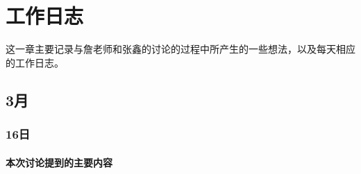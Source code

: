 
\chapter{工作日志}

{\heiti 这一章主要记录与詹老师和张鑫的讨论的过程中所产生的一些想法，以及每天相应的工作日志。}

\section{3月}
\subsection{16日}

\subsubsection{本次讨论提到的主要内容}

